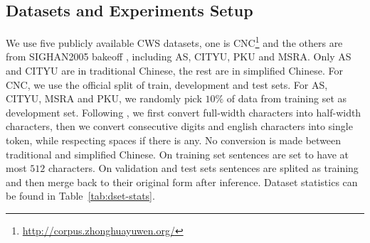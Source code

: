 \documentclass[11pt]{article}
\begin{document}

\subsection{Datasets and Experiments Setup}\label{sec:hps}

We use five publicly available CWS datasets, one is CNC\footnote{\url{http://corpus.zhonghuayuwen.org/}} and the others are from SIGHAN2005 bakeoff \cite{emerson-2005-second}, including AS, CITYU, PKU and MSRA.
Only AS and CITYU are in traditional Chinese, the rest are in simplified Chinese.
For CNC, we use the official split of train, development and test sets.
For AS, CITYU, MSRA and PKU, we randomly pick \(10\%\) of data from training set as development set.
Following \cite{cai-etal-2017-fast}, we first convert full-width characters into half-width characters, then we convert consecutive digits and english characters into single token, while respecting spaces if there is any.
No conversion is made between traditional and simplified Chinese.
On training set sentences are set to have at most \(512\) characters.
On validation and test sets sentences are splited as training and then merge back to their original form after inference.
Dataset statistics can be found in Table~\ref{tab:dset-stats}.
\end{document}
